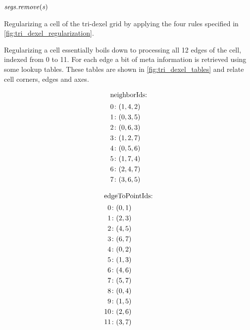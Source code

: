 \begin{algorithm}
\begin{algorithmic}[1]
						\State $\mathit{segs}.\mathit{remove}(\mathit{s})$
					\EndIf
				\EndFor
			\EndFor
		\EndFunction
	\end{algorithmic}
	\caption{
		Regularizing a cell of the tri-dexel grid by applying the four rules specified in \cref{fig:tri_dexel_regularization}.
	}
	\label{alg:tri_dexel_regularization}
\end{algorithm}
%
Regularizing a cell essentially boils down to processing all 12 edges of the cell, indexed from 0 to 11.
For each edge a bit of meta information is retrieved using some lookup tables.
These tables are shown in \cref{fig:tri_dexel_tables} and relate cell corners, edges and axes.
%
\begin{figure}
	\centering
	\begin{subfigure}[t]{0.25\textwidth}
		\centering
		\begin{align*}
			\shortintertext{neighborIds:}
			0 &\colon (1, 4, 2) \\
			1 &\colon (0, 3, 5) \\
			2 &\colon (0, 6, 3) \\
			3 &\colon (1, 2, 7) \\
			4 &\colon (0, 5, 6) \\
			5 &\colon (1, 7, 4) \\
			6 &\colon (2, 4, 7) \\
			7 &\colon (3, 6, 5)
		\end{align*}
	\end{subfigure}%
	\begin{subfigure}[t]{0.25\textwidth}
		\centering
		\begin{align*}
			\shortintertext{edgeToPointIds:}
			 0 &\colon (0, 1) \\
			 1 &\colon (2, 3) \\
			 2 &\colon (4, 5) \\
			 3 &\colon (6, 7) \\
			 4 &\colon (0, 2) \\
			 5 &\colon (1, 3) \\
			 6 &\colon (4, 6) \\
			 7 &\colon (5, 7) \\
			 8 &\colon (0, 4) \\
			 9 &\colon (1, 5) \\
			10 &\colon (2, 6) \\
			11 &\colon (3, 7)

\end{align*}
\end{subfigure}
\end{figure}
